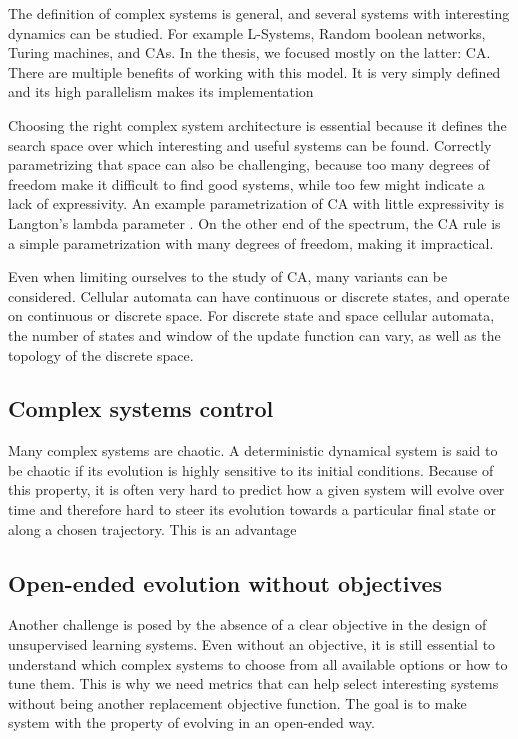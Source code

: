The definition of complex systems is general, and several systems with
interesting dynamics can be studied. For example L-Systems, Random boolean
networks, Turing machines, and \Acfp{CA}. In the thesis, we focused mostly on
the latter: \ac{CA}. There are multiple benefits of working with this model. It
is very simply defined and its high parallelism makes its implementation

Choosing the right complex system architecture is essential because it defines
the search space over which interesting and useful systems can be found.
Correctly parametrizing that space can also be challenging, because too many
degrees of freedom make it difficult to find good systems, while too few might
indicate a lack of expressivity. An example parametrization of \ac{CA} with
little expressivity is Langton's lambda parameter
\parencite{langton_computation_1990}. On the other end of the spectrum, the \ac{CA}
rule is a simple parametrization with many degrees of freedom, making it
impractical.

Even when limiting ourselves to the study of \ac{CA}, many variants
can be considered. Cellular automata can have continuous or discrete states, and
operate on continuous or discrete space. For discrete state and space cellular
automata, the number of states and window of the update function can vary, as
well as the topology of the discrete space.


\subsection{Complex systems control}

Many complex systems are chaotic. A deterministic dynamical system is said to be
chaotic if its evolution is highly sensitive to its initial conditions. Because
of this property, it is often very hard to predict how a given system will
evolve over time and therefore hard to steer its evolution towards a particular
final state or along a chosen trajectory. This is an advantage

\subsection{Open-ended evolution without objectives}

Another challenge is posed by the absence of a clear objective in the design of
unsupervised learning systems. Even without an objective, it is still essential
to understand which complex systems to choose from all available options or how
to tune them. This is why we need metrics that can help select interesting
systems without being another replacement objective function. The goal is to
make system with the property of evolving in an open-ended way.

